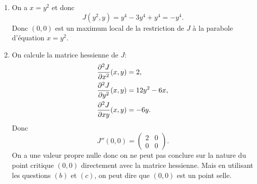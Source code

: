 {\begin{td-sol}
\begin{enumerate}[label=(\alph*)]
            \item On a \(x = y^2\) et donc
            \begin{equation*}
                J(y^2, y) = y^4 - 3y^4 + y^4 = -y^4.
            \end{equation*}
            Donc \((0, 0)\) est un maximum local de la restriction de \(J\) à la parabole d'équation \(x = y^2\).

            \item On calcule la matrice hessienne de \(J\):
            \begin{equation*}
                \begin{aligned}
                    \frac{\partial ^2 J}{\partial x^2}(x,y) &= 2,\\
                    \frac{\partial ^2 J}{\partial y^2}(x,y) &= 12y^2 - 6x,\\
                    \frac{\partial ^2 J}{\partial x y}(x,y) &= -6y.
                \end{aligned}
            \end{equation*}
            Donc
            \begin{equation*}
                J''(0,0) = \begin{pmatrix}
                    2 & 0\\
                    0 & 0
                \end{pmatrix}.
            \end{equation*}
            On a une valeur propre nulle donc on ne peut pas conclure sur la nature du point critique \((0, 0)\)
            directement avec la matrice hessienne. Mais en utilisant les questions \((b)\) et \((c)\), on peut
            dire que \((0, 0)\) est un point selle.

        \end{enumerate}
    \end{td-sol}
}{}